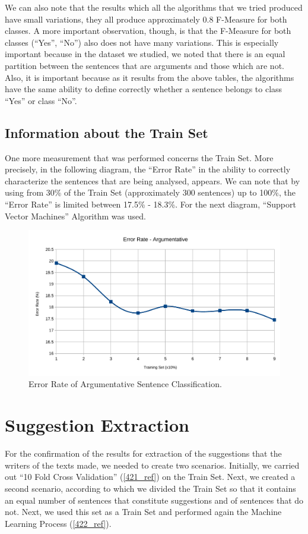We can also note that the results which all the algorithms that we tried produced  have small variations, they all produce approximately 0.8 F-Measure for both classes. A more important observation, though, is that the F-Measure for both classes (``Yes'', ``No'') also does not have many variations. This is especially important because in the dataset we studied, we noted that there is an equal partition between the sentences that are arguments and those which are not. Also, it is important because as it results from the above tables, the algorithms have the same ability to define correctly whether a sentence belongs to class ``Yes'' or class ``No''.

\subsection{Information about the Train Set}\label{413_ref}
One more measurement that was performed concerns the Train Set. More precisely, in the following diagram, the ``Error Rate'' in the ability to correctly characterize the sentences that are being analysed, appears. We can note that by using from 30\% of the Train Set (approximately 300 sentences) up to 100\%, the ``Error Rate'' is limited between 17.5\% - 18.3\%. For the next diagram, ``Support Vector Machines'' Algorithm was used.

\begin{figure}[H]
\centering
\includegraphics[width=1\linewidth]{figure/arguments/errorRate-argumentative}
\caption{Error Rate of Argumentative Sentence Classification.}
\end{figure}

\section{Suggestion Extraction}\label{42_ref}
For the confirmation of the results for extraction of the suggestions that the writers of the texts made, we needed to create two scenarios. Initially, we carried out ``10 Fold Cross Validation'' (\ref{421_ref}) on the Train Set. Next, we created a second scenario, according to which we divided the Train Set so that it contains an equal number of sentences that constitute suggestions and of sentences that do not. Next, we used this set as a Train Set and performed again the Machine Learning Process (\ref{422_ref}).

